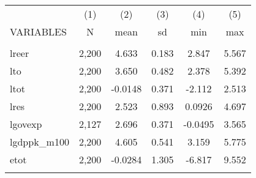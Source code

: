 \documentclass[]{article}
\begin{document}
\begin{tabular}{lccccc} \hline
 & (1) & (2) & (3) & (4) & (5) \\
VARIABLES & N & mean & sd & min & max \\ \hline
 &  &  &  &  &  \\
lreer & 2,200 & 4.633 & 0.183 & 2.847 & 5.567 \\
lto & 2,200 & 3.650 & 0.482 & 2.378 & 5.392 \\
ltot & 2,200 & -0.0148 & 0.371 & -2.112 & 2.513 \\
lres & 2,200 & 2.523 & 0.893 & 0.0926 & 4.697 \\
lgovexp & 2,127 & 2.696 & 0.371 & -0.0495 & 3.565 \\
lgdppk\_m100 & 2,200 & 4.605 & 0.541 & 3.159 & 5.775 \\
etot & 2,200 & -0.0284 & 1.305 & -6.817 & 9.552 \\
 &  &  &  &  &  \\ \hline
\end{tabular}
\end{document}
